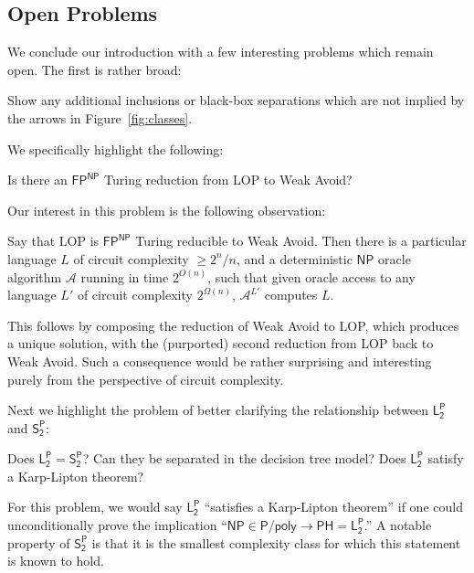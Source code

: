 \subsection{Open Problems}\label{sec:open-probs}
We conclude our introduction with a few interesting problems which remain open. The first is rather broad:
\begin{problem}
Show any additional inclusions or black-box separations which are not implied by the arrows in Figure~\ref{fig:classes}.
\end{problem}
We specifically highlight the following:
\begin{problem}\label{prob:lop-to-avoid}
Is there an $\mathsf{FP^{NP}}$ Turing reduction from {\sc LOP} to {\sc Weak Avoid}?
\end{problem}
Our interest in this problem is the following observation:
\begin{observation}
Say that {\sc LOP} is $\mathsf{FP^{NP}}$ Turing reducible to {\sc Weak Avoid}. Then there is a particular language $L$ of circuit complexity $\geq 2^n/n$, and a deterministic $\mathsf{NP}$ oracle algorithm $\mathcal{A}$ running in time $2^{O(n)}$, such that given oracle access to any language $L'$ of circuit complexity $2^{\Omega(n)}$, $\mathcal{A}^{L'}$ computes $L$.
\end{observation}
This follows by composing the reduction of {\sc Weak Avoid} to {\sc LOP}, which produces a unique solution, with the (purported) second reduction from {\sc LOP} back to {\sc Weak Avoid}. Such a consequence would be rather surprising and interesting purely from the perspective of circuit complexity.

Next we highlight the problem of better clarifying the relationship between $\mathsf{L_2^P}$ and $\mathsf{S_2^P}$:
\begin{problem}
Does $\mathsf{L_2^P} = \mathsf{S_2^P}$? Can they be separated in the decision tree model? Does $\mathsf{L_2^P}$ satisfy a Karp-Lipton theorem?
\end{problem}
For this problem, we would say $\mathsf{L_2^P}$ ``satisfies a Karp-Lipton theorem'' if one could unconditionally prove the implication ``$\mathsf{NP} \in \mathsf{P/poly} \rightarrow \mathsf{PH}=\mathsf{L_2^P}$.'' A notable property of $\mathsf{S_2^P}$ is that it is the smallest complexity class for which this statement is known to hold.

